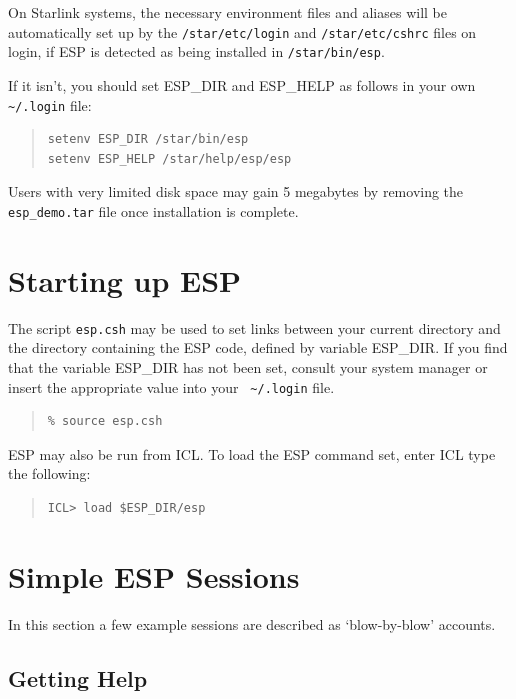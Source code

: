 \documentclass[twoside,11pt]{article}
\newenvironment{myquote}{\begin{quote}\begin{small}}{\end{small}\end{quote}}
\begin{document}
On Starlink systems, the necessary environment files and aliases will
be automatically set up by the {\tt /star/etc/login} and {\tt /star/etc/cshrc}
files on login, if ESP is detected as being installed in {\tt /star/bin/esp}.

If it isn't, you should set ESP\_DIR and ESP\_HELP as follows in your own 
{\verb+ ~/.login+} file:

\begin{myquote}
\begin{verbatim}
setenv ESP_DIR /star/bin/esp
setenv ESP_HELP /star/help/esp/esp
\end{verbatim}
\end{myquote}

Users with very limited disk space may gain 5 megabytes by removing the 
{\tt esp\_demo.tar} file once installation is complete.

\section{Starting up ESP}
\label{sec:starting}

The script {\tt esp.csh} may be used to set links between your current
directory and the directory containing the ESP code, defined by
variable ESP\_DIR.  If you find that the variable ESP\_DIR has not been
set, consult your system manager or insert the appropriate value into
your {\verb+ ~/.login+} file.

\begin{myquote}
\begin{verbatim}
% source esp.csh
\end{verbatim}
\end{myquote}

ESP may also be run from ICL. To load the ESP command set, enter ICL type
the following:

\begin{myquote}
\begin{verbatim}
ICL> load $ESP_DIR/esp
\end{verbatim}
\end{myquote}
 
\section{Simple ESP Sessions}
\label{sec:session}

In this section a few example sessions are described as `blow-by-blow' 
accounts. 


\subsection{Getting Help}
\end{document}
